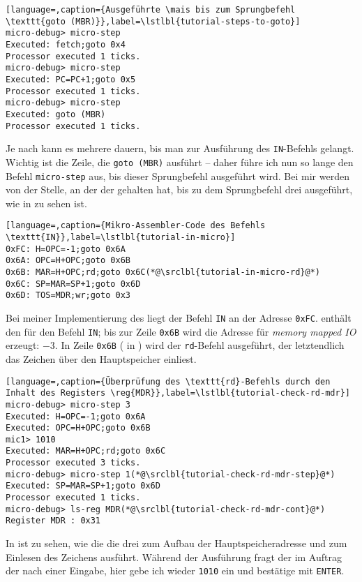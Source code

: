 \begin{lstlisting}[language=,caption={Ausgeführte \mais bis zum Sprungbefehl \texttt{goto (MBR)}},label=\lstlbl{tutorial-steps-to-goto}]
micro-debug> micro-step
Executed: fetch;goto 0x4
Processor executed 1 ticks.
micro-debug> micro-step
Executed: PC=PC+1;goto 0x5
Processor executed 1 ticks.
micro-debug> micro-step
Executed: goto (MBR)
Processor executed 1 ticks.
\end{lstlisting}

Je nach \mac kann es mehrere \mais dauern, bis man zur Ausführung des \texttt{IN}-Befehls gelangt. Wichtig ist die Zeile, die \texttt{goto~(MBR)} ausführt -- daher führe ich nun so lange den Befehl \texttt{micro-step} aus, bis dieser Sprungbefehl ausgeführt wird. Bei mir werden von der Stelle, an der der \md gehalten hat, bis zu dem Sprungbefehl drei \mais ausgeführt, wie in  zu sehen ist.

\begin{lstlisting}[language=,caption={Mikro-Assembler-Code des Befehls \texttt{IN}},label=\lstlbl{tutorial-in-micro}]
0xFC: H=OPC=-1;goto 0x6A
0x6A: OPC=H+OPC;goto 0x6B
0x6B: MAR=H+OPC;rd;goto 0x6C(*@\srclbl{tutorial-in-micro-rd}@*)
0x6C: SP=MAR=SP+1;goto 0x6D
0x6D: TOS=MDR;wr;goto 0x3
\end{lstlisting}

Bei meiner Implementierung des \mac liegt der Befehl \texttt{IN} an der Adresse \texttt{0xFC}.  enthält den \mac für den Befehl \texttt{IN}; bis zur Zeile \texttt{0x6B} wird die Adresse für \emph{memory mapped IO} erzeugt: $-3$. In Zeile \texttt{0x6B} ( in ) wird der \texttt{rd}-Befehl ausgeführt, der letztendlich das Zeichen über den Hauptspeicher einliest.

\begin{lstlisting}[language=,caption={Überprüfung des \texttt{rd}-Befehls durch den Inhalt des Registers \reg{MDR}},label=\lstlbl{tutorial-check-rd-mdr}]
micro-debug> micro-step 3
Executed: H=OPC=-1;goto 0x6A
Executed: OPC=H+OPC;goto 0x6B
mic1> 1010
Executed: MAR=H+OPC;rd;goto 0x6C
Processor executed 3 ticks.
micro-debug> micro-step 1(*@\srclbl{tutorial-check-rd-mdr-step}@*)
Executed: SP=MAR=SP+1;goto 0x6D
Processor executed 1 ticks.
micro-debug> ls-reg MDR(*@\srclbl{tutorial-check-rd-mdr-cont}@*)
Register MDR : 0x31
\end{lstlisting}

In  ist zu sehen, wie die \mic die drei \mais zum Aufbau der Hauptspeicheradresse und zum Einlesen des Zeichens ausführt. Während der Ausführung fragt der \md im Auftrag der \mic nach einer Eingabe, hier gebe ich wieder \texttt{1010} ein und bestätige mit \texttt{ENTER}.

